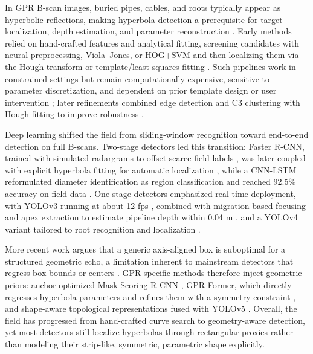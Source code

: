 \documentclass[lettersize,journal]{IEEEtran}
\begin{document}
In GPR B-scan images, buried pipes, cables, and roots typically appear as hyperbolic reflections, making hyperbola detection a prerequisite for target localization, depth estimation, and parameter reconstruction \cite{jin2024gprformer,lei2020cnnlstm,maas2013violahough}. Early methods relied on hand-crafted features and analytical fitting, screening candidates with neural preprocessing, Viola--Jones, or HOG+SVM and then localizing them via the Hough transform or template/least-squares fitting \cite{alnuaimy2000nn,maas2013violahough,lee2014hog,sagnard2016template,dou2017c3}. Such pipelines work in constrained settings but remain computationally expensive, sensitive to parameter discretization, and dependent on prior template design or user intervention \cite{lei2020cnnlstm,pham2018fasterrcnn,sagnard2016template,kafedziski2018c3hough}; later refinements combined edge detection and C3 clustering with Hough fitting to improve robustness \cite{kafedziski2018c3hough,barkataki2023c3}.

Deep learning shifted the field from sliding-window recognition toward end-to-end detection on full B-scans. Two-stage detectors led this transition: Faster R-CNN, trained with simulated radargrams to offset scarce field labels \cite{pham2018fasterrcnn}, was later coupled with explicit hyperbola fitting for automatic localization \cite{lei2019autohyperbola}, while a CNN-LSTM reformulated diameter identification as region classification and reached 92.5\% accuracy on field data \cite{lei2020cnnlstm}. One-stage detectors emphasized real-time deployment, with YOLOv3 running at about 12 fps \cite{li2020yolov3}, combined with migration-based focusing and apex extraction to estimate pipeline depth within 0.04 m \cite{liu2022pipeline}, and a YOLOv4 variant tailored to root recognition and localization \cite{li2022yolov4root}.

More recent work argues that a generic axis-aligned box is suboptimal for a structured geometric echo, a limitation inherent to mainstream detectors that regress box bounds or centers \cite{ren2015fasterrcnn,zhou2019centernet}. GPR-specific methods therefore inject geometric priors: anchor-optimized Mask Scoring R-CNN \cite{hou2021msrcnn}, GPR-Former, which directly regresses hyperbola parameters and refines them with a symmetry constraint \cite{jin2024gprformer}, and shape-aware topological representations fused with YOLOv5 \cite{kang2025tda}. Overall, the field has progressed from hand-crafted curve search to geometry-aware detection, yet most detectors still localize hyperbolas through rectangular proxies rather than modeling their strip-like, symmetric, parametric shape explicitly.
\end{document}
